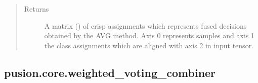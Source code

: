 \documentclass[letterpaper,10pt,english]{sphinxmanual}
\begin{document}
\begin{fulllineitems}
\begin{fulllineitems}
\begin{quote}
\begin{description}
\item[{Returns}] \leavevmode
\sphinxAtStartPar
A matrix () of crisp assignments which represents fused
decisions obtained by the AVG method. Axis 0 represents samples and axis 1 the class
assignments which are aligned with axis 2 in  input tensor.

\end{description}\end{quote}

\end{fulllineitems}


\end{fulllineitems}



\subsection{pusion.core.weighted\_voting\_combiner}
\label{\detokenize{pusion.core.weighted_voting_combiner:module-pusion.core.weighted_voting_combiner}}\label{\detokenize{pusion.core.weighted_voting_combiner:pusion-core-weighted-voting-combiner}}\label{\detokenize{pusion.core.weighted_voting_combiner:wv-cref}}\label{\detokenize{pusion.core.weighted_voting_combiner::doc}}
\end{document}
